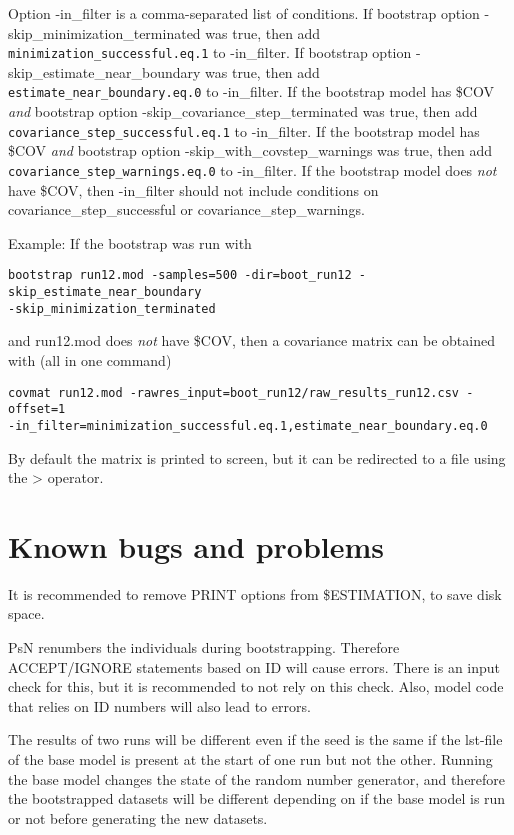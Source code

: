 Option -in\_filter is a comma-separated list of conditions.
If bootstrap option -skip\_minimization\_terminated was true, then add 
\verb|minimization_successful.eq.1|
to -in\_filter. 
If bootstrap option -skip\_estimate\_near\_boundary was true, then add 
\verb|estimate_near_boundary.eq.0| 
to -in\_filter. 
If the bootstrap model has \$COV \emph{and} bootstrap option -skip\_covariance\_step\_terminated was true, then add
\verb|covariance_step_successful.eq.1| 
to -in\_filter. 
If the bootstrap model has \$COV \emph{and} bootstrap option -skip\_with\_covstep\_warnings was true, then add
\verb|covariance_step_warnings.eq.0| 
to -in\_filter. 
If the bootstrap model does \emph{not} have \$COV, then -in\_filter should not include conditions on covariance\_step\_successful or
covariance\_step\_warnings.

Example: If the bootstrap was run with
\begin{verbatim}
bootstrap run12.mod -samples=500 -dir=boot_run12 -skip_estimate_near_boundary 
-skip_minimization_terminated
\end{verbatim}
and run12.mod does \emph{not} have \$COV, then a covariance matrix can be obtained with (all in one command)

\begin{verbatim}
covmat run12.mod -rawres_input=boot_run12/raw_results_run12.csv -offset=1 
-in_filter=minimization_successful.eq.1,estimate_near_boundary.eq.0
\end{verbatim}

By default the matrix is printed to screen, but it can be redirected to a file using the > operator.


\section{Known bugs and problems}

It is recommended to remove PRINT options from \$ESTIMATION, to save disk space.

PsN renumbers the individuals during bootstrapping. Therefore ACCEPT/IGNORE statements based on ID will cause errors. 
There is an input check for this, but it is recommended to not rely on this check. Also, model code that relies on ID numbers will also lead to
errors.

The results of two runs will be different even if the seed is the same if the lst-file of the base model is present at the start of one run but not the other. Running the base model changes the state of the random number generator, and therefore the bootstrapped datasets will be different depending on if the base model is run or not before generating the  new datasets. 

